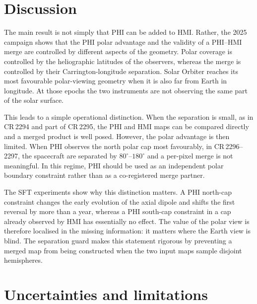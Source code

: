 \documentclass{aa}
\begin{document}
\section{Discussion}
\label{sec:discussion}

The main result is not simply that PHI can be added to HMI\@. Rather, the 2025 campaign shows that the PHI polar advantage and the validity of a PHI--HMI merge are controlled by different aspects of the geometry. Polar coverage is controlled by the heliographic latitudes of the observers, whereas the merge is controlled by their Carrington-longitude separation. Solar Orbiter reaches its most favourable polar-viewing geometry when it is also far from Earth in longitude. At those epochs the two instruments are not observing the same part of the solar surface.

This leads to a simple operational distinction. When the separation is small, as in CR\,2294 and part of CR\,2295, the PHI and HMI maps can be compared directly and a merged product is well posed. However, the polar advantage is then limited. When PHI observes the north polar cap most favourably, in CR\,2296--2297, the spacecraft are separated by $80^{\circ}$--$180^{\circ}$ and a per-pixel merge is not meaningful. In this regime, PHI should be used as an independent polar boundary constraint rather than as a co-registered merge partner.

The SFT experiments show why this distinction matters. A PHI north-cap constraint changes the early evolution of the axial dipole and shifts the first reversal by more than a year, whereas a PHI south-cap constraint in a cap already observed by HMI has essentially no effect. The value of the polar view is therefore localised in the missing information: it matters where the Earth view is blind. The separation guard makes this statement rigorous by preventing a merged map from being constructed when the two input maps sample disjoint hemispheres.

\section{Uncertainties and limitations}
\label{sec:uncertainties}
\end{document}
